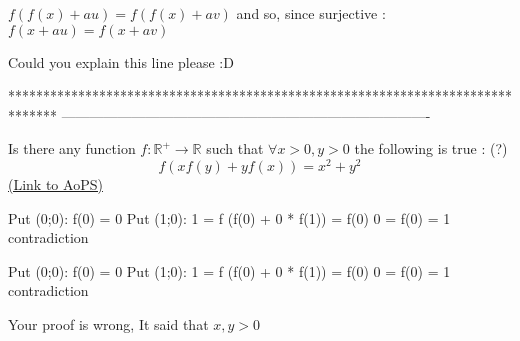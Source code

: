 \begin{solution}
	\begin{tcolorbox} $f(f(x)+au)=f(f(x)+av)$ and so, since surjective :$f(x+au)=f(x+av)$\end{tcolorbox}
Could you explain this line please  :D 


\end{solution}



*******************************************************************************
-------------------------------------------------------------------------------

\begin{problem}
	Is there any function $f: \mathbb{R}^{+} \to \mathbb{R}$ such that $\forall x > 0 ,y >0$ the following is true : (?)
$$f(xf(y)+yf(x))=x^2+y^2$$
	\flushright \href{https://artofproblemsolving.com/community/c6h1557983}{(Link to AoPS)}
\end{problem}



\begin{solution}
	Put (0;0):  f(0) = 0
Put (1;0):  1 = f (f(0) + 0 * f(1)) = f(0)
0 = f(0) = 1 contradiction
\end{solution}



\begin{solution}
	\begin{tcolorbox}Put (0;0):  f(0) = 0
Put (1;0):  1 = f (f(0) + 0 * f(1)) = f(0)
0 = f(0) = 1 contradiction\end{tcolorbox}

Your proof is wrong, It said that ${x},{y}>0$
\end{solution}



